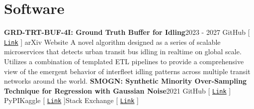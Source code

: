 \documentclass{article}
\begin{document}
\section*{Software}
        \textbf{GRD-TRT-BUF-4I: Ground Truth Buffer for Idling}\hfill{2023 - 2027}\newline
        \faGithub\space GitHub [ \href{https://github.com/nickkunz/idling}{\texttt{Link}} ] \space \faBook \space arXiv  \space\faGlobe\space Website \newline\newline
        A novel algorithm designed as a series of scalable microservices that detects urban transit bus idling in realtime on global scale. Utilizes a combination of templated ETL pipelines to provide a comprehensive view of the emergent behavior of interfleet idling patterns across multiple transit networks around the world.\newline\newline
        \textbf{SMOGN: Synthetic Minority Over-Sampling Technique for Regression with Gaussian Noise}\hfill{2021}\newline
        \faGithub\space GitHub [ \href{https://github.com/nickkunz/smogn}{\texttt{Link}} ] \space\faPython\space PyPI\space\faUsers\space Kaggle [ \href{https://www.kaggle.com/aleksandradeis/regression-addressing-extreme-rare-cases}{\texttt{Link}} ]\space\faStackExchange\space Stack Exchange [ \href{https://datascience.stackexchange.com/questions/39232/how-to-make-multiple-regression-perform-better-for-outliers-without-reducing-e/64933#64933}{\texttt{Link}} ]\newline\newline
\end{document}

